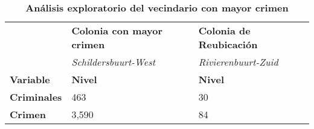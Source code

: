 \def\arraystretch{1.5} %
\begin{table}[H]
\centering
\caption{\textbf{An\'alisis exploratorio del vecindario con mayor crimen}}
\footnotesize
\centering
\begin{tabular}{p{1.2cm} p{3.3cm} p{3.3cm}}
& \textbf{Colonia con mayor crimen} & \textbf{Colonia de Reubicaci\'on}\\  & \textit{Schildersbuurt-West} & \textit{Rivierenbuurt-Zuid}\\
\textbf{Variable} & \textbf{Nivel} & \textbf{Nivel}\\
\hline
\hline 
\textbf{Criminales} & 463 & 30\\
\textbf{Crimen} & 3,590 & 84\\
\end{tabular}
\label{tab:tabla1}
\end{table}